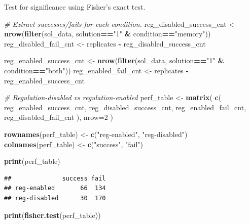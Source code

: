 \documentclass[]{book}
\newenvironment{Shaded}{\begin{snugshade}}{\end{snugshade}}
\newcommand{\CommentTok}[1]{\textcolor[rgb]{0.56,0.35,0.01}{\textit{#1}}}
\newcommand{\DataTypeTok}[1]{\textcolor[rgb]{0.13,0.29,0.53}{#1}}
\newcommand{\DecValTok}[1]{\textcolor[rgb]{0.00,0.00,0.81}{#1}}
\newcommand{\KeywordTok}[1]{\textcolor[rgb]{0.13,0.29,0.53}{\textbf{#1}}}
\newcommand{\NormalTok}[1]{#1}
\newcommand{\OperatorTok}[1]{\textcolor[rgb]{0.81,0.36,0.00}{\textbf{#1}}}
\newcommand{\StringTok}[1]{\textcolor[rgb]{0.31,0.60,0.02}{#1}}
\begin{document}
Test for significance using Fisher's exact test.

\begin{Shaded}
\begin{Highlighting}[]
\CommentTok{# Extract successes/fails for each condition.}
\NormalTok{reg_disabled_success_cnt <-}\StringTok{ }\KeywordTok{nrow}\NormalTok{(}\KeywordTok{filter}\NormalTok{(sol_data, solution}\OperatorTok{==}\StringTok{"1"} \OperatorTok{&}\StringTok{ }\NormalTok{condition}\OperatorTok{==}\StringTok{"memory"}\NormalTok{))}
\NormalTok{reg_disabled_fail_cnt <-}\StringTok{ }\NormalTok{replicates }\OperatorTok{-}\StringTok{ }\NormalTok{reg_disabled_success_cnt}

\NormalTok{reg_enabled_success_cnt <-}\StringTok{ }\KeywordTok{nrow}\NormalTok{(}\KeywordTok{filter}\NormalTok{(sol_data, solution}\OperatorTok{==}\StringTok{"1"} \OperatorTok{&}\StringTok{ }\NormalTok{condition}\OperatorTok{==}\StringTok{"both"}\NormalTok{))}
\NormalTok{reg_enabled_fail_cnt <-}\StringTok{ }\NormalTok{replicates }\OperatorTok{-}\StringTok{ }\NormalTok{reg_enabled_success_cnt}

\CommentTok{# Regulation-disabled vs regulation-enabled}
\NormalTok{perf_table <-}\StringTok{ }\KeywordTok{matrix}\NormalTok{(}
  \KeywordTok{c}\NormalTok{(}
\NormalTok{    reg_enabled_success_cnt,}
\NormalTok{    reg_disabled_success_cnt,}
\NormalTok{    reg_enabled_fail_cnt,}
\NormalTok{    reg_disabled_fail_cnt}
\NormalTok{    ),}
    \DataTypeTok{nrow=}\DecValTok{2}
\NormalTok{)}

\KeywordTok{rownames}\NormalTok{(perf_table) <-}\StringTok{ }\KeywordTok{c}\NormalTok{(}\StringTok{"reg-enabled"}\NormalTok{, }\StringTok{"reg-disabled"}\NormalTok{)}
\KeywordTok{colnames}\NormalTok{(perf_table) <-}\StringTok{ }\KeywordTok{c}\NormalTok{(}\StringTok{"success"}\NormalTok{, }\StringTok{"fail"}\NormalTok{)}

\KeywordTok{print}\NormalTok{(perf_table)}
\end{Highlighting}
\end{Shaded}

\begin{verbatim}
##              success fail
## reg-enabled       66  134
## reg-disabled      30  170
\end{verbatim}

\begin{Shaded}
\begin{Highlighting}[]
\KeywordTok{print}\NormalTok{(}\KeywordTok{fisher.test}\NormalTok{(perf_table))}
\end{Highlighting}
\end{Shaded}
\end{document}

